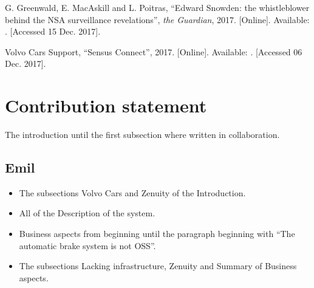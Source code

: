 \documentclass[conference]{IEEEtran}
\begin{document}
\begin{thebibliography}{00}
	G. Greenwald, E. MacAskill and L. Poitras,
	``Edward Snowden: the whistleblower behind the NSA surveillance revelations'',
	\emph{the Guardian},
	2017.
	[Online]. Available: .
	[Accessed 15 Dec. 2017].
	
	Volvo Cars Support,
	``Sensus Connect'',
	2017.
	[Online]. Available: .
	[Accessed 06 Dec. 2017].
	
	
\end{thebibliography}

\newpage
\appendix
\section*{Contribution statement}
The introduction until the first subsection where written in collaboration.
\subsection{Emil}
\begin{itemize}
	\item
	The subsections Volvo Cars and Zenuity of  the Introduction.
	\item
	All of the Description of the system.
	\item
	Business aspects from beginning until the paragraph beginning with ``The automatic brake system is not OSS''.
	\item
	The subsections Lacking infrastructure, Zenuity and Summary of Business aspects.
\end{itemize}
\end{document}
